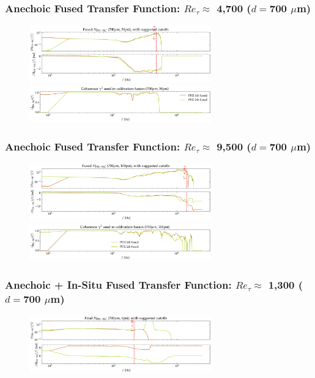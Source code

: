 \documentclass[aspectratio=169,9pt]{beamer}
\begin{document}
\begin{frame}
  \frametitle{Anechoic Fused Transfer Function: $Re_\tau \approx$ 4,700 ($d=$700 $\mu$m)}
  \begin{figure}
    \centering
    \includegraphics[width=0.7\textwidth]{tf_calib/700_50psi_H_anechoic_fused.png}
    \includegraphics[width=0.7\textwidth]{tf_calib/700_50psi_gamma_fuse.png}
  \end{figure}
\end{frame}

\begin{frame}
  \frametitle{Anechoic Fused Transfer Function: $Re_\tau \approx$ 9,500 ($d=$700 $\mu$m)}
  \begin{figure}
    \centering
    \includegraphics[width=0.7\textwidth]{tf_calib/700_100psi_H_anechoic_fused.png}
    \includegraphics[width=0.7\textwidth]{tf_calib/700_100psi_gamma_fuse.png}
  \end{figure}
\end{frame}

\begin{frame}
  \frametitle{Anechoic + In-Situ Fused Transfer Function: $Re_\tau \approx$ 1,300 ($d=$700 $\mu$m)}
  \begin{figure}
    \centering
    \includegraphics[width=0.7\textwidth]{tf_calib/700_0psi_H_fuse_situ.png}
  \end{figure}
\end{frame}
\end{document}
